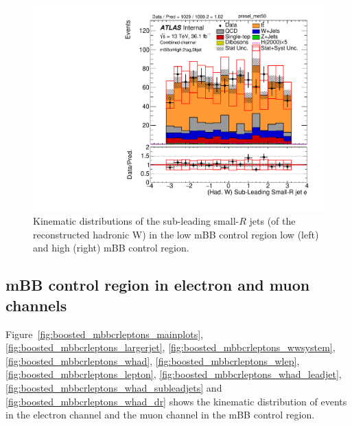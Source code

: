 \begin{figure}[!ht]
\begin{center}
\includegraphics[scale=0.33]{./figures/boosted/PlotByMbbRegions/DataMC_2tag_0bjet_mbbcrHigh_lepton_presel_met50_LightJet2Phi}                                                                       
\caption{Kinematic distributions of the sub-leading small-$R$ jets (of the reconstructed hadronic W) in the low mBB control region low (left) and high (right) mBB control region.}
\label{fig:boosted_mbbcrHighLow_whad_subleadjets}
\end{center}
\end{figure}

\FloatBarrier
%
%
%
%
\subsection{mBB control region in electron and muon channels}
\label{app:boosted_mbbcontrolregion_leptonchannels}

Figure~\ref{fig:boosted_mbbcrleptons_mainplots}, \ref{fig:boosted_mbbcrleptons_largerjet}, \ref{fig:boosted_mbbcrleptons_wwsystem},
\ref{fig:boosted_mbbcrleptons_whad}, \ref{fig:boosted_mbbcrleptons_wlep}, \ref{fig:boosted_mbbcrleptons_lepton}, \ref{fig:boosted_mbbcrleptons_whad_leadjet},
\ref{fig:boosted_mbbcrleptons_whad_subleadjets} and \ref{fig:boosted_mbbcrleptons_whad_dr} shows the kinematic distribution of events 
in the electron channel and the muon channel in the mBB control region.

